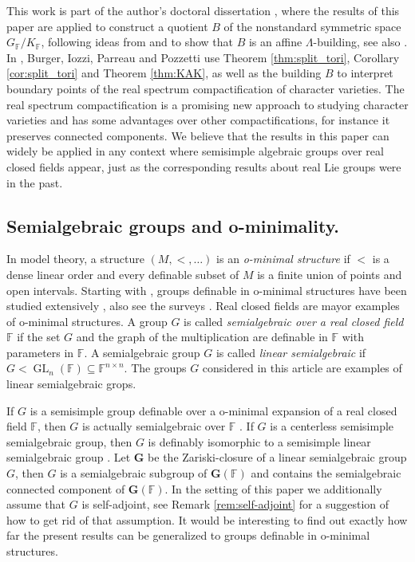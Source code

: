 \documentclass[12pt]{amsart}
\newcommand{\F}{\mathbb{F} }
\newcommand{\bG}{\mathbf{G}}
\numberwithin{equation}{section}
\theoremstyle{remark} %
\begin{document}
	This work is part of the author's doctoral dissertation \cite{App24arxiv}, where the results of this paper are applied to construct a quotient $B$ of the nonstandard symmetric space $G_\F / K_\F$, following ideas from \cite{KrTe} and to show that $B$ is an affine $\Lambda$-building, see also \cite{appenzeller2026buildings}. In \cite{BIPP21,BIPP23arxiv}, Burger, Iozzi, Parreau and Pozzetti use Theorem \ref{thm:split_tori}, Corollary \ref{cor:split_tori} and Theorem \ref{thm:KAK}, as well as the building $B$ to interpret boundary points of the real spectrum compactification of character varieties. The real spectrum compactification is a promising new approach to studying character varieties and has some advantages over other compactifications, for instance it preserves connected components. We believe that the results in this paper can widely be applied in any context where semisimple algebraic groups over real closed fields appear, just as the corresponding results about real Lie groups were in the past. 
	
	\subsection{Semialgebraic groups and o-minimality.}
	
	In model theory, a structure $(M,<,\ldots)$ is an \emph{o-minimal structure} if $<$ is a dense linear order and every definable subset of $M$ is a finite union of points and open intervals.  Starting with \cite{Pil88}, groups definable in o-minimal structures have been studied extensively \cite{OPP96, PPS00a, PPS00b, PPS02, CoPi13, Con14, BJO14, BBO19, COP22}, also see the surveys \cite{Ote08, Con21}. Real closed fields are mayor examples of o-minimal structures. A group $G$ is called \emph{semialgebraic over a real closed field $\F$} if the set $G$ and the graph of the multiplication are definable in $\F$ with parameters in $\F$. A semialgebraic group $G$ is called \emph{linear semialgebraic} if $G < \operatorname{GL}_n(\F) \subseteq \F^{n \times n}$. The groups $G$ considered in this article are examples of linear semialgebraic grops.
	
	If $G$ is a semisimple group definable over a o-minimal expansion of a real closed field $\F$, then $G$ is actually semialgebraic over $\F$ \cite{PPS02}. If $G$ is a centerless semisimple semialgebraic group, then $G$ is definably isomorphic to a semisimple linear semialgebraic group \cite[Cor. 3.3]{OPP96}. Let $\bG$ be the Zariski-closure of a linear semialgebraic group $G$, then $G$ is a semialgebraic subgroup of $\bG(\F)$ and contains the semialgebraic connected component of $\bG(\F)$. In the setting of this paper we additionally assume that $G$ is self-adjoint, see Remark \ref{rem:self-adjoint} for a suggestion of how to get rid of that assumption. It would be interesting to find out exactly how far the present results can be generalized to groups definable in o-minimal structures.
	
\end{document}
